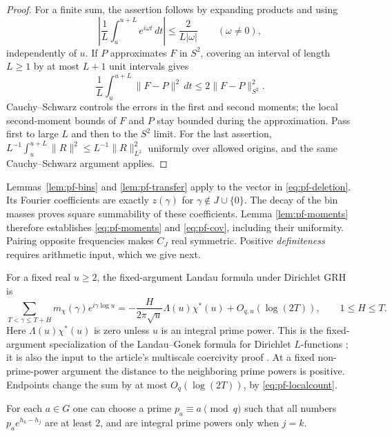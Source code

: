 \begin{proof}
For a finite sum, the assertion follows by expanding products and using
\[
 \left|\frac1L\int_u^{u+L}e^{i\omega t}\,dt\right|
                 \leq\frac2{L|\omega|}\qquad(\omega\ne0),
\]
independently of $u$.  If $P$ approximates $F$ in $S^2$, covering an
interval of length $L\geq1$ by at most $L+1$ unit intervals gives
\[
 \frac1L\int_u^{u+L}\|F-P\|^2\,dt\leq2\|F-P\|_{S^2}^2.
\]
Cauchy--Schwarz controls the errors in the first and second moments;
the local second-moment bounds of $F$ and $P$ stay bounded during the
approximation.  Pass first to large $L$ and then to the $S^2$ limit.
For the last assertion,
$L^{-1}\int_u^{u+L}\|R\|^2\leq L^{-1}\|R\|_{L^2}^2$ uniformly over
allowed origins, and the same Cauchy--Schwarz argument applies.
\end{proof}

Lemmas~\ref{lem:pf-bins} and \ref{lem:pf-transfer} apply to the vector
in \eqref{eq:pf-deletion}.  Its Fourier coefficients are exactly
$z(\gamma)$ for $\gamma\notin J\cup\{0\}$.  The decay of the bin
masses proves square summability of these coefficients.  Lemma
\ref{lem:pf-moments} therefore establishes \eqref{eq:pf-moments} and
\eqref{eq:pf-cov}, including their uniformity.  Pairing opposite
frequencies makes $C_J$ real symmetric.  Positive \emph{definiteness}
requires arithmetic input, which we give next.

For a fixed real $u\geq2$, the fixed-argument Landau formula under
Dirichlet GRH is
\begin{equation}
\label{eq:pf-landau}
 \sum_{T<\gamma\leq T+H}m_\chi(\gamma)e^{i\gamma\log u}
 =-\frac{H}{2\pi\sqrt{u}}\Lambda(u)\chi^*(u)
                       +O_{q,u}(\log(2T)),
 \qquad 1\leq H\leq T.
\end{equation}
Here $\Lambda(u)\chi^*(u)$ is zero unless $u$ is an integral prime
power.  This is the fixed-argument specialization of the
Landau--Gonek formula for Dirichlet $L$-functions
\cite[Theorem~1.2]{Banks2023}; it is also the input to the article's
multiscale coercivity proof \cite{ProveItArticle}.  At a fixed
non-prime-power argument the distance to the neighboring prime powers
is positive.  Endpoints change the sum by at most $O_q(\log(2T))$, by
\eqref{eq:pf-localcount}.

\begin{lemma}
\label{lem:pf-probes}
For each $a\in G$ one can choose a prime $p_a\equiv a\pmod q$ such
that all numbers $p_a e^{h_k-h_j}$ are at least $2$, and are integral
prime powers only when $j=k$.
\end{lemma}

